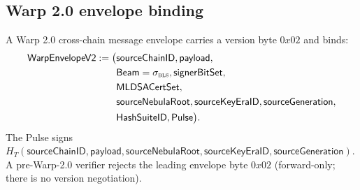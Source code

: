 \subsection*{Warp 2.0 envelope binding}

\begin{definition}
\label{def:warp-v2-envelope}
A Warp 2.0 cross-chain message envelope carries a version byte
$0x02$ and binds:
\begin{align*}
\mathsf{WarpEnvelopeV2} := \bigl( &\mathsf{sourceChainID}, \mathsf{payload}, \\
& \mathsf{Beam} = \sigma_{\textsc{bls}}, \mathsf{signerBitSet}, \\
& \mathsf{MLDSACertSet}, \\
& \mathsf{sourceNebulaRoot}, \mathsf{sourceKeyEraID}, \mathsf{sourceGeneration}, \\
& \mathsf{HashSuiteID}, \mathsf{Pulse} \bigr).
\end{align*}
The Pulse signs $H_T(\mathsf{sourceChainID}, \mathsf{payload},
\mathsf{sourceNebulaRoot}, \mathsf{sourceKeyEraID},
\mathsf{sourceGeneration})$. A pre-Warp-2.0 verifier rejects the
leading envelope byte $0x02$ (forward-only; there is no version
negotiation).
\end{definition}
